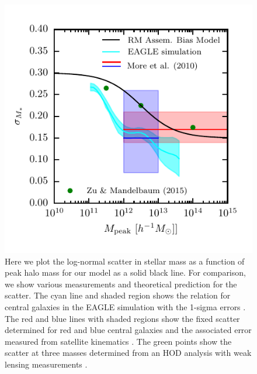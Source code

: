 \documentclass[a4paper,fleqn,usenatbib]{mnras}
\begin{document}
\begin{figure}
    \includegraphics{figures/scatter_model.pdf}
    \caption{Here we plot the log-normal scatter in stellar mass as a function of peak halo mass for our model as a solid black line.  For comparison, we show various measurements and theoretical prediction for the scatter.  The cyan line and shaded region shows the relation for central galaxies in the EAGLE simulation with the 1-sigma errors \citep{Matthee:2016vm}.  The red and blue lines with shaded regions show the fixed scatter determined for red and blue central galaxies and the associated error measured from satellite kinematics \citep{More:2011il}.  The green points show the scatter at three masses determined from an HOD analysis with weak lensing measurements \citep{Zu:2015vh}.}
    \label{fig:scatter_model}
\end{figure}
\end{document}
